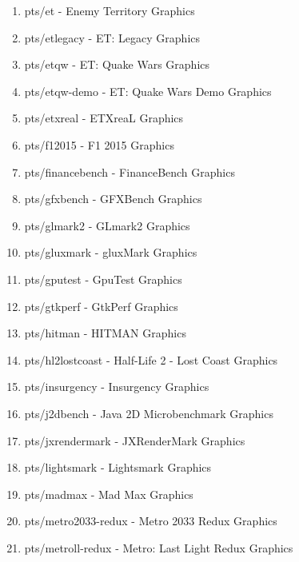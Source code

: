 \documentclass[french]{article}
\begin{document}
\begin{enumerate}
\item pts/et                         - Enemy Territory                     Graphics 
\item pts/etlegacy                   - ET: Legacy                          Graphics 
\item pts/etqw                       - ET: Quake Wars                      Graphics 
\item pts/etqw-demo                  - ET: Quake Wars Demo                 Graphics 
\item pts/etxreal                    - ETXreaL                             Graphics 
\item pts/f12015                     - F1 2015                             Graphics 
\item pts/financebench               - FinanceBench                        Graphics 
\item pts/gfxbench                   - GFXBench                            Graphics 
\item pts/glmark2                    - GLmark2                             Graphics 
\item pts/gluxmark                   - gluxMark                            Graphics 
\item pts/gputest                    - GpuTest                             Graphics 
\item pts/gtkperf                    - GtkPerf                             Graphics 
\item pts/hitman                     - HITMAN                              Graphics 
\item pts/hl2lostcoast               - Half-Life 2 - Lost Coast            Graphics 
\item pts/insurgency                 - Insurgency                          Graphics 
\item pts/j2dbench                   - Java 2D Microbenchmark              Graphics 
\item pts/jxrendermark               - JXRenderMark                        Graphics 
\item pts/lightsmark                 - Lightsmark                          Graphics 
\item pts/madmax                     - Mad Max                             Graphics 
\item pts/metro2033-redux            - Metro 2033 Redux                    Graphics 
\item pts/metroll-redux              - Metro: Last Light Redux             Graphics 

\end{enumerate}
\end{document}
